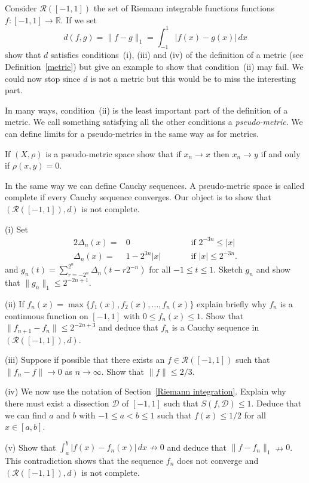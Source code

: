 \begin{exercise}\label{integral not complete}
Consider ${\mathcal R}([-1,1])$ the set of
Riemann integrable functions 
functions $f:[-1,1]\rightarrow{\mathbb R}$. If we set
\[d(f,g)=\|f-g\|_{1}=\int_{-1}^{1}|f(x)-g(x)|\,dx\]
show that $d$ satisfies conditions~(i), (iii) and
(iv) of the definition of a metric (see Definition~\ref{metric})
but give an example to show that condition~(ii)
may fail.  We could now stop since $d$ is not a metric
but this would be to miss the interesting part.

In many ways, condition~(ii) is the least important
part of the definition of a metric. We call something
satisfying all the other conditions a \emph{pseudo-metric}.
We can define limits for a pseudo-metrics in the same way
as for metrics. 

If $(X,\rho)$ is a pseudo-metric space 
show that if $x_{n}\rightarrow x$
then $x_{n}\rightarrow y$ if and only if $\rho(x,y)=0$.

In the same way we can define Cauchy sequences. A
pseudo-metric space is called complete if every
Cauchy sequence converges. Our object is to show
that $({\mathcal R}([-1,1]),d)$ is not complete.

(i) Set
\begin{alignat*}{2} 
\Delta_{n}(x)=&0&&\qquad\text{if $2^{-3n}\leq |x|$}\\
\Delta_{n}(x)=&1-2^{3n}|x|&&\qquad\text{if $|x|\leq 2^{-3n}$.}
\end{alignat*}
and $g_{n}(t)=\sum_{r=-2^{n}}^{2^{n}}\Delta_{n}(t-r2^{-n})$
for all $-1\leq t\leq 1$. Sketch $g_{n}$ and show that
$\|g_{n}\|_{1}\leq 2^{-2n+1}$.

(ii) If $f_{n}(x)=\max\{f_{1}(x),f_{2}(x),\dots,f_{n}(x)\}$
explain briefly why $f_{n}$ is a continuous function
on $[-1,1]$ with $0\leq f_{n}(x)\leq 1$. Show that
$\|f_{n+1}-f_{n}\|\leq 2^{-2n+3}$ and deduce that
$f_{n}$ is a Cauchy sequence in $({\mathcal R}([-1,1]),d)$.

(iii) Suppose if possible that there exists an 
$f\in {\mathcal R}([-1,1])$ such that $\|f_{n}-f\|\rightarrow 0$
as $n\rightarrow\infty$. Show that $\|f\|\leq 2/3$.

(iv) We now use the notation of Section~\ref{Riemann integration}.
Explain why there must exist a dissection 
$\mathcal{D}$ of $[-1,1]$ such that $S(f,\mathcal{D})\leq 1$.
Deduce that we can find $a$ and $b$ with $-1\leq a <b\leq 1$
such that $f(x)\leq 1/2$ for all $x\in [a,b]$. 

(v) Show that $\int_{a}^{b}|f(x)-f_{n}(x)|\,dx\nrightarrow 0$
and deduce that $\|f-f_{n}\|_{1}\nrightarrow 0$. This
contradiction shows that the sequence $f_{n}$ does not converge
and $({\mathcal R}([-1,1]),d)$ is not complete.


\end{exercise}
